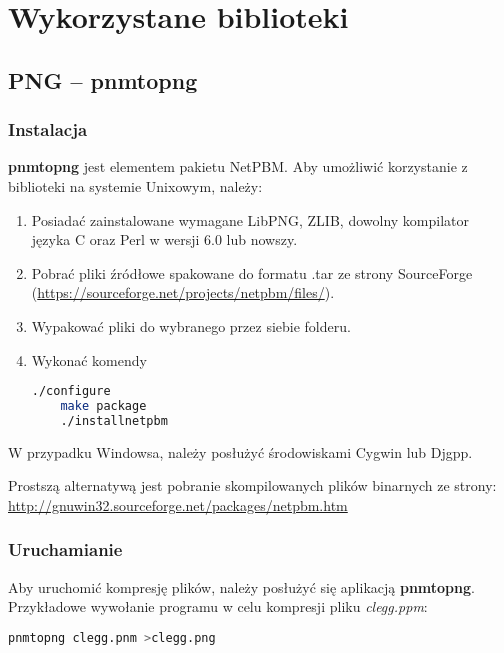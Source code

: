 \section{Wykorzystane biblioteki}

\subsection{PNG -- pnmtopng}

\subsubsection{Instalacja}

\textbf{pnmtopng} jest elementem pakietu NetPBM. Aby umożliwić korzystanie z biblioteki na systemie Unixowym, należy:

\begin{enumerate}
	\item Posiadać zainstalowane wymagane LibPNG, ZLIB, dowolny kompilator języka C oraz Perl w wersji 6.0 lub nowszy.
	\item Pobrać pliki źródłowe spakowane do formatu .tar ze strony SourceForge (\url{https://sourceforge.net/projects/netpbm/files/}).
	
	\item Wypakować pliki do wybranego przez siebie folderu.
	
	\item Wykonać komendy
	\begin{lstlisting}[language=bash]
	./configure
	make package
	./installnetpbm
	\end{lstlisting}
\end{enumerate}

W przypadku Windowsa, należy posłużyć środowiskami Cygwin lub Djgpp.

Prostszą alternatywą jest pobranie skompilowanych plików binarnych ze strony: \url{http://gnuwin32.sourceforge.net/packages/netpbm.htm}

\subsubsection{Uruchamianie}

Aby uruchomić kompresję plików, należy posłużyć się aplikacją \textbf{pnmtopng}. Przykładowe wywołanie programu w celu kompresji pliku \textit{clegg.pp\textsl{}m}:

\begin{lstlisting}[language=bash]
	pnmtopng clegg.pnm >clegg.png
\end{lstlisting}


